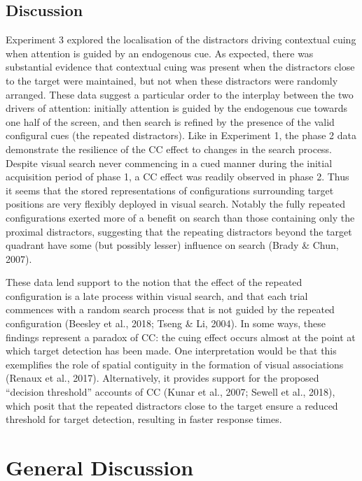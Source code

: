 \documentclass[
  man,
  floatsintext,
  longtable,
  nolmodern,
  notxfonts,
  notimes,
  colorlinks=true,linkcolor=blue,citecolor=blue,urlcolor=blue]{apa7}
\begin{document}
\subsection{Discussion}\label{discussion-2}

Experiment 3 explored the localisation of the distractors driving
contextual cuing when attention is guided by an endogenous cue. As
expected, there was substantial evidence that contextual cuing was
present when the distractors close to the target were maintained, but
not when these distractors were randomly arranged. These data suggest a
particular order to the interplay between the two drivers of attention:
initially attention is guided by the endogenous cue towards one half of
the screen, and then search is refined by the presence of the valid
configural cues (the repeated distractors). Like in Experiment 1, the
phase 2 data demonstrate the resilience of the CC effect to changes in
the search process. Despite visual search never commencing in a cued
manner during the initial acquisition period of phase 1, a CC effect was
readily observed in phase 2. Thus it seems that the stored
representations of configurations surrounding target positions are very
flexibly deployed in visual search. Notably the fully repeated
configurations exerted more of a benefit on search than those containing
only the proximal distractors, suggesting that the repeating distractors
beyond the target quadrant have some (but possibly lesser) influence on
search (Brady \& Chun, 2007).

These data lend support to the notion that the effect of the repeated
configuration is a late process within visual search, and that each
trial commences with a random search process that is not guided by the
repeated configuration (Beesley et al., 2018; Tseng \& Li, 2004). In
some ways, these findings represent a paradox of CC: the cuing effect
occurs almost at the point at which target detection has been made. One
interpretation would be that this exemplifies the role of spatial
contiguity in the formation of visual associations (Renaux et al.,
2017). Alternatively, it provides support for the proposed ``decision
threshold'' accounts of CC (Kunar et al., 2007; Sewell et al., 2018),
which posit that the repeated distractors close to the target ensure a
reduced threshold for target detection, resulting in faster response
times.

\section{General Discussion}\label{general-discussion}
\end{document}
